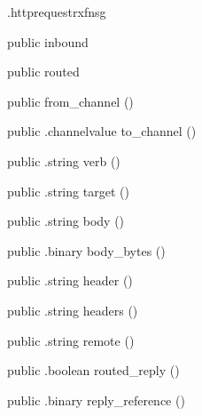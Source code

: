 \begin{CrexxClass}{.httprequest}{rxfnsg}

  \begin{Hierarchy}
  \end{Hierarchy}

  \begin{Members}

    \Factory
      {public}
      {inbound}
      {}

    \Factory
      {public}
      {routed}
      {}

    \Factory
      {public}
      {from\_channel}
      {()}

    \Method
      {public}
      {.channelvalue}
      {to\_channel}
      {()}

    \Method
      {public}
      {.string}
      {verb}
      {()}

    \Method
      {public}
      {.string}
      {target}
      {()}

    \Method
      {public}
      {.string}
      {body}
      {()}

    \Method
      {public}
      {.binary}
      {body\_bytes}
      {()}

    \Method
      {public}
      {.string}
      {header}
      {()}

    \Method
      {public}
      {.string}
      {headers}
      {()}

    \Method
      {public}
      {.string}
      {remote}
      {()}

    \Method
      {public}
      {.boolean}
      {routed\_reply}
      {()}

    \Method
      {public}
      {.binary}
      {reply\_reference}
      {()}

  \end{Members}
\end{CrexxClass}

